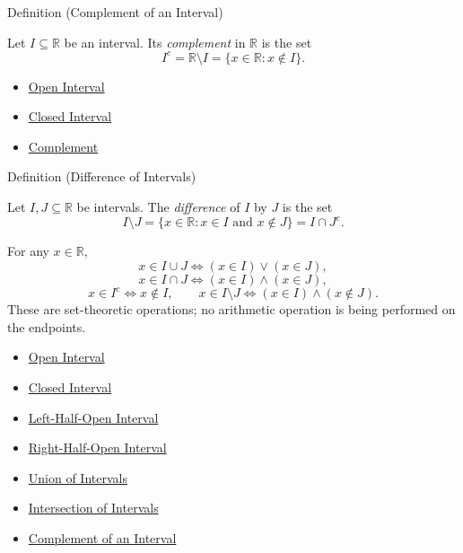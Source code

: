 \begin{definitionbox}{Definition (Complement of an Interval)}
\begin{definition}
\label{def:complement-of-interval}
Let $I\subseteq\mathbb{R}$ be an interval. Its \emph{complement} in
$\mathbb{R}$ is the set
\[
I^{c}=\mathbb{R}\setminus I
=\{x\in\mathbb{R}:x\notin I\}.
\]
\end{definition}
\end{definitionbox}

\begin{dependencies}
\begin{itemize}
  \item \hyperref[def:open-interval]{Open Interval}
  \item \hyperref[def:closed-interval]{Closed Interval}
  \item \hyperref[def:complement]{Complement}
\end{itemize}
\end{dependencies}

\begin{definitionbox}{Definition (Difference of Intervals)}
\begin{definition}
\label{def:difference-of-intervals}
Let $I,J\subseteq\mathbb{R}$ be intervals. The \emph{difference} of $I$ by
$J$ is the set
\[
I\setminus J=\{x\in\mathbb{R}:x\in I\text{ and }x\notin J\}
=I\cap J^{c}.
\]
\end{definition}
\end{definitionbox}

\begin{remark*}
For any $x\in\mathbb{R}$,
\[
x\in I\cup J \Longleftrightarrow (x\in I)\lor(x\in J),
\]
\[
x\in I\cap J \Longleftrightarrow (x\in I)\land(x\in J),
\]
\[
x\in I^c \Longleftrightarrow x\notin I,
\qquad
x\in I\setminus J \Longleftrightarrow (x\in I)\land(x\notin J).
\]
These are set-theoretic operations; no arithmetic operation is being performed
on the endpoints.
\end{remark*}

\begin{dependencies}
\begin{itemize}
  \item \hyperref[def:open-interval]{Open Interval}
  \item \hyperref[def:closed-interval]{Closed Interval}
  \item \hyperref[def:left-half-open-interval]{Left-Half-Open Interval}
  \item \hyperref[def:right-half-open-interval]{Right-Half-Open Interval}
  \item \hyperref[def:union-of-intervals]{Union of Intervals}
  \item \hyperref[def:intersection-of-intervals]{Intersection of Intervals}
  \item \hyperref[def:complement-of-interval]{Complement of an Interval}
\end{itemize}
\end{dependencies}

